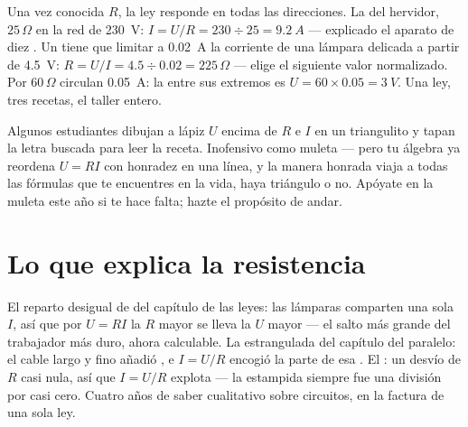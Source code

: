 \begin{example}\label{ex:g8:ohms-law:compute}
Una vez conocida $R$, la ley responde en todas las direcciones. La
 del hervidor, $25\,\Omega$ en la red de \qty{230}{V}: $I =
U/R = 230 \div 25 = \qty{9.2}{A}$ --- explicado el aparato de
diez . Un  tiene que limitar a
\qty{0.02}{A} la corriente de una lámpara delicada a partir de
\qty{4.5}{V}: $R = U/I = 4.5 \div 0.02 = 225\,\Omega$ --- elige el
siguiente valor normalizado. Por $60\,\Omega$ circulan \qty{0.05}{A}:
la  entre sus extremos es $U = 60 \times 0.05 =
\qty{3}{V}$. Una ley, tres recetas, el taller entero.
\end{example}

\begin{remark}\label{rem:g8:ohms-law:triangle}
Algunos estudiantes dibujan a lápiz $U$ encima de $R$ e $I$ en un
triangulito y tapan la letra buscada para leer la receta. Inofensivo
como muleta --- pero tu álgebra ya reordena $U = R I$ con honradez en
una línea, y la manera honrada viaja a todas las fórmulas que te
encuentres en la vida, haya triángulo o no. Apóyate en la muleta este
año si te hace falta; hazte el propósito de andar.
\end{remark}

\section{Lo que explica la resistencia}

\begin{example}\label{ex:g8:ohms-law:mysteries}
El reparto desigual de  del capítulo de las leyes: las
lámparas  comparten una sola $I$, así que por $U = R I$ la $R$
mayor se lleva la $U$ mayor --- el salto más grande del trabajador más
duro, ahora calculable. La  estrangulada del capítulo del
paralelo: el cable largo y fino añadió , e $I = U/R$
encogió la parte de esa . El : un
desvío de $R$ casi nula, así que $I = U/R$ explota --- la estampida
siempre fue una división por casi cero. Cuatro años de saber
cualitativo sobre circuitos, en la factura de una sola ley.
\end{example}

